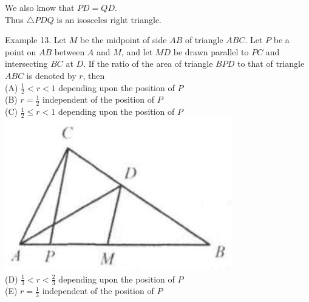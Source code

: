 \documentclass[10pt]{article}
\begin{document}
We also know that \(P D=Q D\).\\
Thus \(\triangle P D Q\) is an isosceles right triangle.


Example 13. Let \(M\) be the midpoint of side \(A B\) of triangle \(A B C\). Let \(P\) be a point on \(A B\) between \(A\) and \(M\), and let \(M D\) be drawn parallel to \(P C\) and intersecting \(B C\) at \(D\). If the ratio of the area of triangle \(B P D\) to that of triangle \(A B C\) is denoted by \(r\), then\\
(A) \(\frac{1}{2}<r<1\) depending upon the position of \(P\)\\
(B) \(r=\frac{1}{2}\) independent of the position of \(P\)\\
(C) \(\frac{1}{2} \leq r<1\) depending upon the position of \(P\)\\
\includegraphics[max width=\textwidth, center]{2025_04_17_97bc1f7e44d93c271a88g-014(1)}\\
(D) \(\frac{1}{3}<r<\frac{2}{3}\) depending upon the position of \(P\)\\
(E) \(r=\frac{1}{3}\) independent of the position of \(P\)
\end{document}
